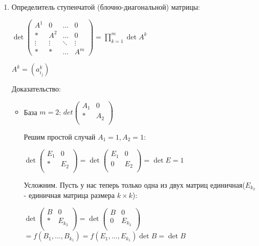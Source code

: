 \documentclass[twoside]{book}
\begin{document}
\begin{enumerate}
    \item Определитель ступенчатой (блочно-диагональной) матрицы:

          \(\det
          \begin{pmatrix}
              A^1    & 0      & \ldots & 0      \\
              *      & A^2    & \ldots & 0      \\
              \vdots & \vdots & \ddots & \vdots \\
              *      & *      & \ldots & A^m
          \end{pmatrix} = \prod\limits_{k=1}^m \det A^k\)


          \(A^k = (a_{i_j}^k)\)

          Доказательство:
          \begin{itemize}
              \item База \(m = 2\):
                    \(det\begin{pmatrix}
                        A_1 & 0   \\
                        *   & A_2 \\
                    \end{pmatrix}\)


                    Решим простой случай \(A_1 = 1, A_2 = 1\):

                    \(\det\begin{pmatrix}
                        E_1 & 0   \\
                        *   & E_2 \\
                    \end{pmatrix} =
                    \det\begin{pmatrix}
                        E_1 & 0   \\
                        0   & E_2 \\
                    \end{pmatrix} = \det E = 1\)\


                    Усложним. Пусть у нас теперь только одна из двух матриц единичная(\(E_{k_2}\) - единичная матрица размера \(k \times k\)):


                    \(\det\begin{pmatrix}
                        B & 0       \\
                        * & E_{k_2} \\
                    \end{pmatrix} =
                    \det\begin{pmatrix}
                        B & 0       \\
                        0 & E_{k_2} \\
                    \end{pmatrix} \)
                    \(= f(B_1, \ldots, B_{k_1}) = f(E_1, \ldots, E_{k_1}) \det B = \det B\)


\end{itemize}
\end{enumerate}
\end{document}
